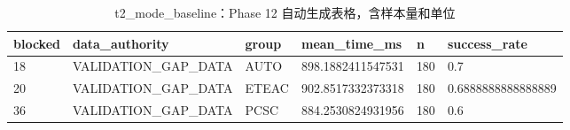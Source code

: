 \begin{table}[htbp]
\centering
\caption{t2_mode_baseline：Phase 12 自动生成表格，含样本量和单位}
\begin{tabular}{llllll}
\hline
blocked & data_authority & group & mean_time_ms & n & success_rate \\
\hline
18 & VALIDATION\_GAP\_DATA & AUTO & 898.1882411547531 & 180 & 0.7 \\
20 & VALIDATION\_GAP\_DATA & ETEAC & 902.8517332373318 & 180 & 0.6888888888888889 \\
36 & VALIDATION\_GAP\_DATA & PCSC & 884.2530824931956 & 180 & 0.6 \\
\hline
\end{tabular}
\end{table}
